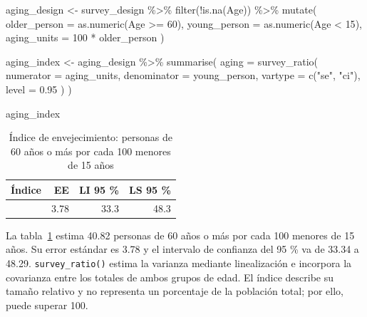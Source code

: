 \documentclass[
  spanish,
  11pt,
  letterpaper,
  oneside,
  open=any]{scrbook}
\newenvironment{Shaded}{\begin{snugshade}}{\end{snugshade}}
\newcommand{\AttributeTok}[1]{\textcolor[rgb]{0.40,0.45,0.13}{#1}}
\newcommand{\DecValTok}[1]{\textcolor[rgb]{0.68,0.00,0.00}{#1}}
\newcommand{\FloatTok}[1]{\textcolor[rgb]{0.68,0.00,0.00}{#1}}
\newcommand{\FunctionTok}[1]{\textcolor[rgb]{0.28,0.35,0.67}{#1}}
\newcommand{\NormalTok}[1]{\textcolor[rgb]{0.00,0.23,0.31}{#1}}
\newcommand{\OtherTok}[1]{\textcolor[rgb]{0.00,0.23,0.31}{#1}}
\newcommand{\SpecialCharTok}[1]{\textcolor[rgb]{0.37,0.37,0.37}{#1}}
\newcommand{\StringTok}[1]{\textcolor[rgb]{0.13,0.47,0.30}{#1}}
\begin{document}
\begin{Shaded}
\begin{Highlighting}[]
\NormalTok{aging\_design }\OtherTok{\textless{}{-}}\NormalTok{ survey\_design }\SpecialCharTok{\%\textgreater{}\%}
  \FunctionTok{filter}\NormalTok{(}\SpecialCharTok{!}\FunctionTok{is.na}\NormalTok{(Age)) }\SpecialCharTok{\%\textgreater{}\%}
  \FunctionTok{mutate}\NormalTok{(}
    \AttributeTok{older\_person =} \FunctionTok{as.numeric}\NormalTok{(Age }\SpecialCharTok{\textgreater{}=} \DecValTok{60}\NormalTok{),}
    \AttributeTok{young\_person =} \FunctionTok{as.numeric}\NormalTok{(Age }\SpecialCharTok{\textless{}} \DecValTok{15}\NormalTok{),}
    \AttributeTok{aging\_units =} \DecValTok{100} \SpecialCharTok{*}\NormalTok{ older\_person}
\NormalTok{  )}

\NormalTok{aging\_index }\OtherTok{\textless{}{-}}\NormalTok{ aging\_design }\SpecialCharTok{\%\textgreater{}\%}
  \FunctionTok{summarise}\NormalTok{(}
    \AttributeTok{aging =} \FunctionTok{survey\_ratio}\NormalTok{(}
      \AttributeTok{numerator =}\NormalTok{ aging\_units,}
      \AttributeTok{denominator =}\NormalTok{ young\_person,}
      \AttributeTok{vartype =} \FunctionTok{c}\NormalTok{(}\StringTok{"se"}\NormalTok{, }\StringTok{"ci"}\NormalTok{),}
      \AttributeTok{level =} \FloatTok{0.95}
\NormalTok{    )}
\NormalTok{  )}

\NormalTok{aging\_index}
\end{Highlighting}
\end{Shaded}

{

\begin{longtable}[]{@{}rrrr@{}}

\caption{\label{tbl-indice-envejecimiento}Índice de envejecimiento:
personas de 60 años o más por cada 100 menores de 15 años}

\tabularnewline

\toprule\noalign{}
Índice & EE & LI 95 \% & LS 95 \% \\
\midrule\noalign{}
\endhead
\bottomrule\noalign{}
\endlastfoot
40.8 & 3.78 & 33.3 & 48.3 \\

\end{longtable}

}

La tabla~\ref{tbl-indice-envejecimiento} estima 40.82 personas de 60
años o más por cada 100 menores de 15 años. Su error estándar es 3.78 y
el intervalo de confianza del 95 \% va de 33.34 a 48.29.
\texttt{survey\_ratio()} estima la varianza mediante linealización e
incorpora la covarianza entre los totales de ambos grupos de edad. El
índice describe su tamaño relativo y no representa un porcentaje de la
población total; por ello, puede superar 100.
\end{document}
